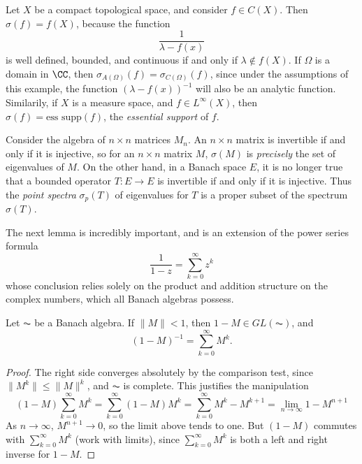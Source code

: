 \begin{example}
    Let $X$ be a compact topological space, and consider $f \in C(X)$. Then $\sigma(f) = f(X)$, because the function
    \[ \frac{1}{\lambda - f(x)} \]
    is well defined, bounded, and continuous if and only if $\lambda \not \in f(X)$. If $\Omega$ is a domain in $\CC$, then $\sigma_{A(\Omega)}(f) = \sigma_{C(\Omega)}(f)$, since under the assumptions of this example, the function $(\lambda - f(x))^{-1}$ will also be an analytic function. Similarily, if $X$ is a measure space, and $f \in L^\infty(X)$, then $\sigma(f) = \text{ess supp}(f)$, the \emph{essential support} of $f$.
\end{example}

\begin{example}
    Consider the algebra of $n \times n$ matrices $M_n$. An $n \times n$ matrix is invertible if and only if it is injective, so for an $n \times n$ matrix $M$, $\sigma(M)$ is \emph{precisely} the set of eigenvalues of $M$. On the other hand, in a Banach space $E$, it is no longer true that a bounded operator $T: E \to E$ is invertible if and only if it is injective. Thus the \emph{point spectra} $\sigma_p(T)$ of eigenvalues for $T$ is a proper subset of the spectrum $\sigma(T)$.
\end{example}

The next lemma is incredibly important, and is an extension of the power series formula
%
\[ \frac{1}{1 - z} = \sum_{k = 0}^\infty z^k \]
%
whose conclusion relies solely on the product and addition structure on the complex numbers, which all Banach algebras possess.

\begin{lemma}
    Let $\AC$ be a Banach algebra. If $\| M \| < 1$, then $1 - M \in GL(\AC)$, and
    \[ (1 - M)^{-1} = \sum_{k = 0}^\infty M^k. \]
\end{lemma}
\begin{proof}
    The right side converges absolutely by the comparison test, since $\| M^k \| \leq \| M \|^k$, and $\AC$ is complete. This justifies the manipulation
    \[ (1 - M) \sum_{k = 0}^\infty M^k = \sum_{k = 0}^\infty (1 - M)M^k = \sum_{k = 0}^\infty M^k - M^{k+1} = \lim_{n \to \infty} 1 - M^{n+1} \]
    As $n \to \infty$, $M^{n+1} \to 0$, so the limit above tends to one. But $(1 - M)$ commutes with $\sum_{k = 0}^\infty M^k$ (work with limits), since $\sum_{k = 0}^\infty M^k$ is both a left and right inverse for $1 - M$.
\end{proof}

